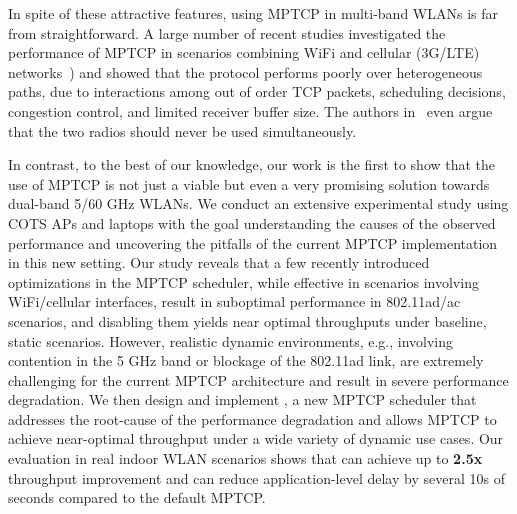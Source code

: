 In spite of these attractive features, using MPTCP in multi-band 
WLANs is far from straightforward. A large number of recent
studies investigated the performance of MPTCP in scenarios combining
WiFi and cellular (3G/LTE)
networks~\cite{raiciu:nsdi2012,chen:imc2013,ferlin:globecom2014,deng:imc2014,saha:mobiwac2017})
and showed that the protocol performs poorly over heterogeneous paths,
due to interactions among out of order TCP packets, scheduling
decisions, congestion control, and limited receiver buffer size. 
The authors in~\cite{sur:mobicom2017,nguyen:vtc2017} even argue that the two
radios should never be used simultaneously.

In contrast, to the best of our knowledge, our work is the first to 
show that the use of MPTCP is not just a viable but even a very promising solution
towards dual-band 5/60 GHz WLANs. We conduct an extensive experimental
study using COTS APs and laptops with the goal 
understanding the causes of the observed performance and uncovering the
pitfalls of the current MPTCP implementation in this new setting. Our
study reveals that a few recently introduced optimizations in the
MPTCP scheduler, while effective in scenarios
involving WiFi/cellular interfaces, result in suboptimal performance in 802.11ad/ac
scenarios, and disabling them yields near
optimal throughputs under baseline, static scenarios. However,
realistic dynamic environments, e.g., involving contention in the 5 GHz
band or blockage of the 802.11ad link, are extremely challenging for
the current MPTCP architecture and result in severe performance
degradation. We then design and implement \name, a new
MPTCP scheduler that addresses the root-cause of the performance
degradation and allows MPTCP to achieve near-optimal throughput under
a wide variety of dynamic use cases. Our evaluation in real
indoor WLAN scenarios shows that \name can achieve up to \textbf{2.5x}
throughput improvement and can reduce application-level delay by several
10s of seconds compared to the default MPTCP.


